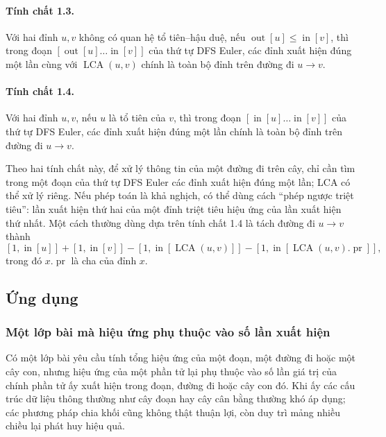 \documentclass[11pt]{article}
\begin{document}
\paragraph{Tính chất 1.3.}
Với hai đỉnh \(u,v\) không có quan hệ tổ tiên--hậu duệ, nếu
\(\operatorname{out}[u]\le \operatorname{in}[v]\), thì trong đoạn
\([\operatorname{out}[u]\ldots \operatorname{in}[v]]\) của thứ tự DFS Euler,
các đỉnh xuất hiện đúng một lần cùng với \(\operatorname{LCA}(u,v)\) chính là
toàn bộ đỉnh trên đường đi \(u\to v\).

\paragraph{Tính chất 1.4.}
Với hai đỉnh \(u,v\), nếu \(u\) là tổ tiên của \(v\), thì trong đoạn
\([\operatorname{in}[u]\ldots \operatorname{in}[v]]\) của thứ tự DFS Euler,
các đỉnh xuất hiện đúng một lần chính là toàn bộ đỉnh trên đường đi \(u\to v\).

Theo hai tính chất này, để xử lý thông tin của một đường đi trên cây, chỉ cần
tìm trong một đoạn của thứ tự DFS Euler các đỉnh xuất hiện đúng một lần; LCA có
thể xử lý riêng. Nếu phép toán là khả nghịch, có thể dùng cách ``phép ngược
triệt tiêu'': lần xuất hiện thứ hai của một đỉnh triệt tiêu hiệu ứng của lần
xuất hiện thứ nhất. Một cách thường dùng dựa trên tính chất 1.4 là tách đường
đi \(u\to v\) thành
\[
  [1,\operatorname{in}[u]]+[1,\operatorname{in}[v]]
  -[1,\operatorname{in}[\operatorname{LCA}(u,v)]]
  -[1,\operatorname{in}[\operatorname{LCA}(u,v).\operatorname{pr}]],
\]
trong đó \(x.\operatorname{pr}\) là cha của đỉnh \(x\).

\subsection{Ứng dụng}

\subsubsection{Một lớp bài mà hiệu ứng phụ thuộc vào số lần xuất hiện}

Có một lớp bài yêu cầu tính tổng hiệu ứng của một đoạn, một đường đi hoặc một
cây con, nhưng hiệu ứng của một phần tử lại phụ thuộc vào số lần giá trị của
chính phần tử ấy xuất hiện trong đoạn, đường đi hoặc cây con đó. Khi ấy các cấu
trúc dữ liệu thông thường như cây đoạn hay cây cân bằng thường khó áp dụng; các
phương pháp chia khối cũng không thật thuận lợi, còn duy trì mảng nhiều chiều
lại phát huy hiệu quả.
\end{document}
